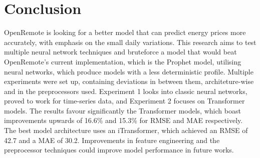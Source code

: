 \section{Conclusion}

OpenRemote is looking for a better model that can predict energy prices more accurately, with emphasis on the small daily variations.
This research aims to test multiple neural network techniques and bruteforce a model that would beat OpenRemote's current implementation, which is the Prophet model, utilising neural networks, which produce models with a less deterministic profile.
Multiple experiments were set up, containing deviations in between them, architeture-wise and in the preprocessors used. Experiment 1 looks into classic neural networks, proved to work for time-series data, and Experiment 2 focuses on Transformer models.
The results favour significantly the Transformer models, which boast improvements upwards of 16.6\% and 15.3\% for RMSE and MAE respectively. The best model architecture uses an iTransformer, which achieved an RMSE of 42.7 and a MAE of 30.2.
Improvements in feature engineering and the preprocessor techniques could improve model performance in future works.